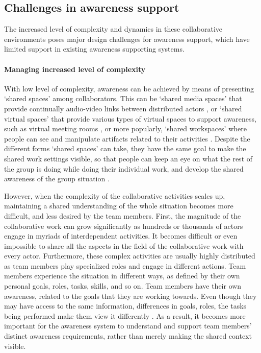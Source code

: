 \subsection{Challenges in awareness support} %
\label{sub:challenges_in_awareness_support}
The increased level of complexity and dynamics in these collaborative environments poses major design challenges for awareness support, which have limited support in existing awareness supporting systems.

\paragraph*{Managing increased level of complexity} %
\label{par:managing_increased_level_of_complexity}
With low level of complexity, awareness can be achieved by means of presenting `shared spaces' among collaborators. This can be `shared media spaces' that provide continually audio-video links between distributed actors \cite{Dourish1992}, or `shared virtual spaces' that provide various types of virtual spaces to support awareness, such as virtual meeting rooms \cite{Berlage1999}, or more popularly, `shared workspaces' where people can see and manipulate artifacts related to their activities \cite{Gutwin2002}. Despite the different forms `shared spaces' can take, they have the same goal to make the shared work settings visible, so that people can keep an eye on what the rest of the group is doing while doing their individual work, and develop the shared awareness of the group situation \cite{schmidt2002a}.

However, when the complexity of the collaborative activities scales up, maintaining a shared understanding of the whole situation becomes more difficult, and less desired by the team members. First, the magnitude of the collaborative work can grow significantly as hundreds or thousands of actors engage in myriads of interdependent activities. It becomes difficult or even impossible to share all the aspects in the field of the collaborative work with every actor. Furthermore, these complex activities are usually highly distributed as team members play specialized roles and engage in different actions. Team members experience the situation in different ways, as defined by their own personal goals, roles, tasks, skills, and so on. Team members have their own awareness, related to the goals that they are working towards. Even though they may have access to the same information, differences in goals, roles, the tasks being performed make them view it differently \cite{Salmon2010}. As a result, it becomes more important for the awareness system to understand and support team members' distinct awareness requirements, rather than merely making the shared context visible.

